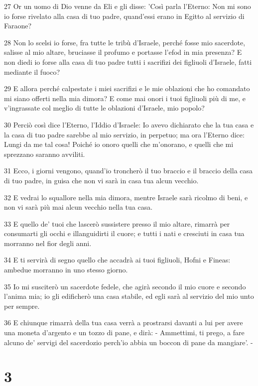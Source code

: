 \par 27 Or un uomo di Dio venne da Eli e gli disse: 'Così parla l'Eterno: Non mi sono io forse rivelato alla casa di tuo padre, quand'essi erano in Egitto al servizio di Faraone?
\par 28 Non lo scelsi io forse, fra tutte le tribù d'Israele, perché fosse mio sacerdote, salisse al mio altare, bruciasse il profumo e portasse l'efod in mia presenza? E non diedi io forse alla casa di tuo padre tutti i sacrifizi dei figliuoli d'Israele, fatti mediante il fuoco?
\par 29 E allora perché calpestate i miei sacrifizi e le mie oblazioni che ho comandato mi siano offerti nella mia dimora? E come mai onori i tuoi figliuoli più di me, e v'ingrassate col meglio di tutte le oblazioni d'Israele, mio popolo?
\par 30 Perciò così dice l'Eterno, l'Iddio d'Israele: Io avevo dichiarato che la tua casa e la casa di tuo padre sarebbe al mio servizio, in perpetuo; ma ora l'Eterno dice: Lungi da me tal cosa! Poiché io onoro quelli che m'onorano, e quelli che mi sprezzano saranno avviliti.
\par 31 Ecco, i giorni vengono, quand'io troncherò il tuo braccio e il braccio della casa di tuo padre, in guisa che non vi sarà in casa tua alcun vecchio.
\par 32 E vedrai lo squallore nella mia dimora, mentre Israele sarà ricolmo di beni, e non vi sarà più mai alcun vecchio nella tua casa.
\par 33 E quello de' tuoi che lascerò sussistere presso il mio altare, rimarrà per consumarti gli occhi e illanguidirti il cuore; e tutti i nati e cresciuti in casa tua morranno nel fior degli anni.
\par 34 E ti servirà di segno quello che accadrà ai tuoi figliuoli, Hofni e Fineas: ambedue morranno in uno stesso giorno.
\par 35 Io mi susciterò un sacerdote fedele, che agirà secondo il mio cuore e secondo l'anima mia; io gli edificherò una casa stabile, ed egli sarà al servizio del mio unto per sempre.
\par 36 E chiunque rimarrà della tua casa verrà a prostrarsi davanti a lui per avere una moneta d'argento e un tozzo di pane, e dirà: - Ammettimi, ti prego, a fare alcuno de' servigi del sacerdozio perch'io abbia un boccon di pane da mangiare'. -

\chapter{3}

